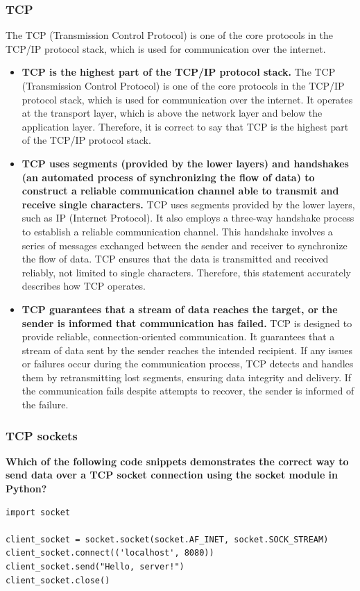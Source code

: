 \subsubsection{TCP}
The TCP (Transmission Control Protocol) is one of the core protocols in the TCP/IP protocol stack, which is used for communication over the internet.
\begin{itemize}
\item \textbf{TCP is the highest part of the TCP/IP protocol stack.} The TCP (Transmission Control Protocol) is one of the core protocols in the TCP/IP protocol stack, which is used for communication over the internet. It operates at the transport layer, which is above the network layer and below the application layer. Therefore, it is correct to say that TCP is the highest part of the TCP/IP protocol stack.

\item \textbf{TCP uses segments (provided by the lower layers) and handshakes (an automated process of synchronizing the flow of data) to construct a reliable communication channel able to transmit and receive single characters.} TCP uses segments provided by the lower layers, such as IP (Internet Protocol). It also employs a three-way handshake process to establish a reliable communication channel. This handshake involves a series of messages exchanged between the sender and receiver to synchronize the flow of data. TCP ensures that the data is transmitted and received reliably, not limited to single characters. Therefore, this statement accurately describes how TCP operates.

\item \textbf{TCP guarantees that a stream of data reaches the target, or the sender is informed that communication has failed.} TCP is designed to provide reliable, connection-oriented communication. It guarantees that a stream of data sent by the sender reaches the intended recipient. If any issues or failures occur during the communication process, TCP detects and handles them by retransmitting lost segments, ensuring data integrity and delivery. If the communication fails despite attempts to recover, the sender is informed of the failure.
\end{itemize}

\subsubsection{TCP sockets}
\textbf{Which of the following code snippets demonstrates the correct way to send data over a TCP socket connection using the socket module in Python?}
\begin{codebox}
\begin{verbatim}
import socket
 
client_socket = socket.socket(socket.AF_INET, socket.SOCK_STREAM)
client_socket.connect(('localhost', 8080))
client_socket.send("Hello, server!")
client_socket.close()
\end{verbatim}
\end{codebox}

